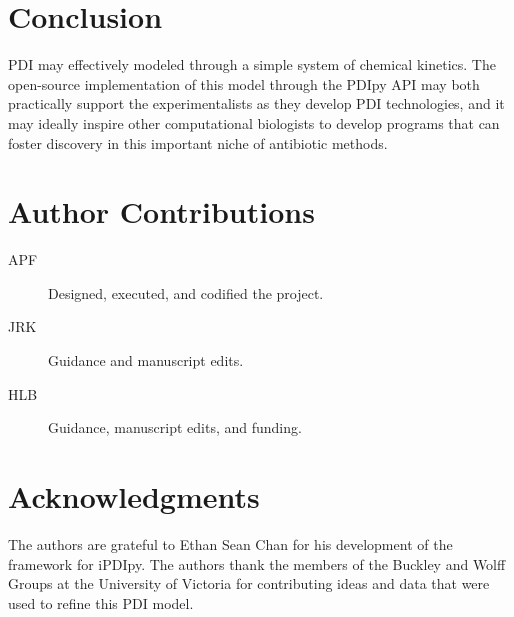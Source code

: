 \section*{Conclusion}
PDI may effectively modeled through a simple system of chemical kinetics. The open-source implementation of this model through the PDIpy API may both practically support the experimentalists as they develop PDI technologies, and it may ideally inspire other computational biologists to develop programs that can foster discovery in this important niche of antibiotic methods.   


\section*{Author Contributions}
\begin{description}
    \item[APF] Designed, executed, and codified the project.
    \item[JRK] Guidance and manuscript edits.
    \item[HLB] Guidance, manuscript edits, and funding.
\end{description}


\section*{Acknowledgments}

The authors are grateful to Ethan Sean Chan for his development of the framework for iPDIpy. The authors thank the members of the Buckley and Wolff Groups at the University of Victoria for contributing ideas and data that were used to refine this PDI model.